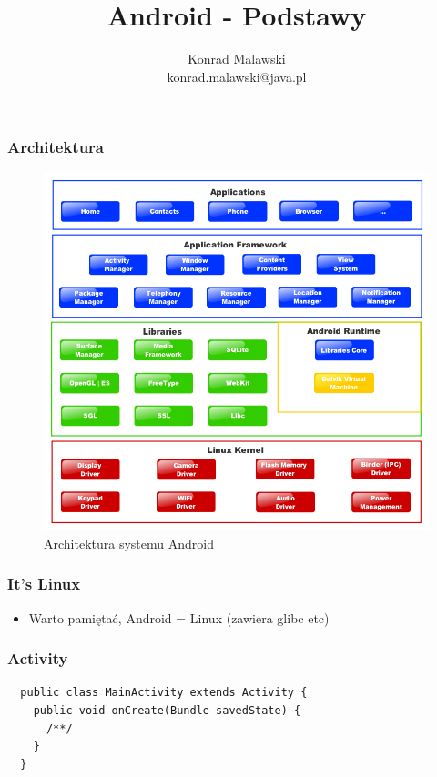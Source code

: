\documentclass{beamer}
\title{Android - Podstawy}
\author{Konrad Malawski \\ konrad.malawski@java.pl}
\begin{document}
\begin{frame}
\titlepage
\end{frame}

\begin{frame}
\frametitle{Architektura}

  \begin{figure}[t]
    \includegraphics[height=0.62\textheight,keepaspectratio=true,clip=true,trim=0 0 0 100]{images/platform}
    \caption{Architektura systemu Android}
  \end{figure}

\end{frame}

\begin{frame}
  \frametitle{It's Linux}
\begin{itemize}
 \item Warto pamiętać, Android = Linux (zawiera glibc etc)
\end{itemize}

\end{frame}

\begin{frame}[fragile]
\frametitle{Activity}
\begin{lstlisting}
  public class MainActivity extends Activity {
    public void onCreate(Bundle savedState) {
      /**/
    }
  }
\end{lstlisting}

\end{frame}
\end{document}
